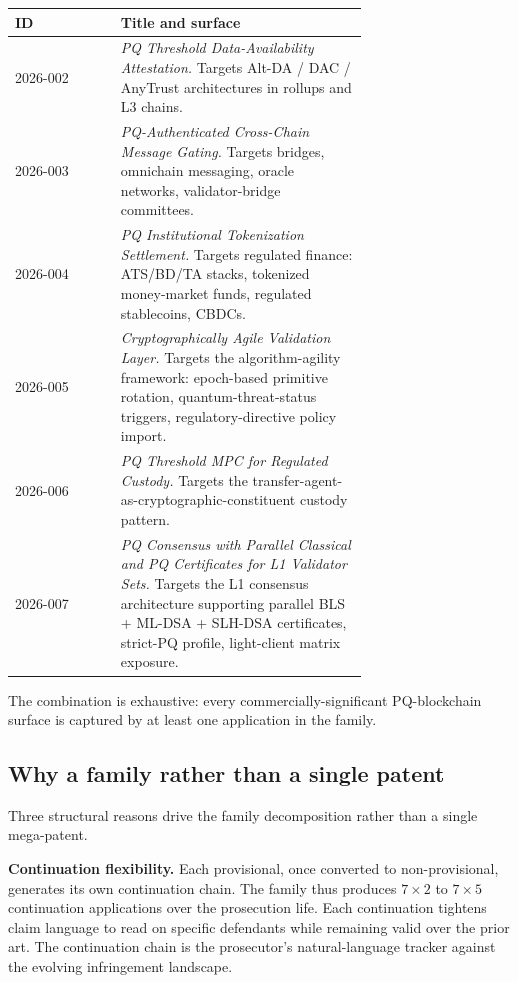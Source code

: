 \documentclass[11pt,letterpaper]{article}
\begin{document}
\begin{longtable}{lp{0.7\linewidth}}
\toprule
\textbf{ID} & \textbf{Title and surface} \\
\midrule
2026-002 & \emph{PQ Threshold Data-Availability Attestation.} Targets Alt-DA / DAC / AnyTrust architectures in rollups and L3 chains. \\
2026-003 & \emph{PQ-Authenticated Cross-Chain Message Gating.} Targets bridges, omnichain messaging, oracle networks, validator-bridge committees. \\
2026-004 & \emph{PQ Institutional Tokenization Settlement.} Targets regulated finance: ATS/BD/TA stacks, tokenized money-market funds, regulated stablecoins, CBDCs. \\
2026-005 & \emph{Cryptographically Agile Validation Layer.} Targets the algorithm-agility framework: epoch-based primitive rotation, quantum-threat-status triggers, regulatory-directive policy import. \\
2026-006 & \emph{PQ Threshold MPC for Regulated Custody.} Targets the transfer-agent-as-cryptographic-constituent custody pattern. \\
2026-007 & \emph{PQ Consensus with Parallel Classical and PQ Certificates for L1 Validator Sets.} Targets the L1 consensus architecture supporting parallel BLS + ML-DSA + SLH-DSA certificates, strict-PQ profile, light-client matrix exposure. \\
\bottomrule
\end{longtable}

The combination is exhaustive: every commercially-significant PQ-blockchain surface is captured by at least one application in the family.

\subsection{Why a family rather than a single patent}

Three structural reasons drive the family decomposition rather than a single mega-patent.

\textbf{Continuation flexibility.} Each provisional, once converted to non-provisional, generates its own continuation chain. The family thus produces $7 \times 2$ to $7 \times 5$ continuation applications over the prosecution life. Each continuation tightens claim language to read on specific defendants while remaining valid over the prior art. The continuation chain is the prosecutor's natural-language tracker against the evolving infringement landscape.
\end{document}

